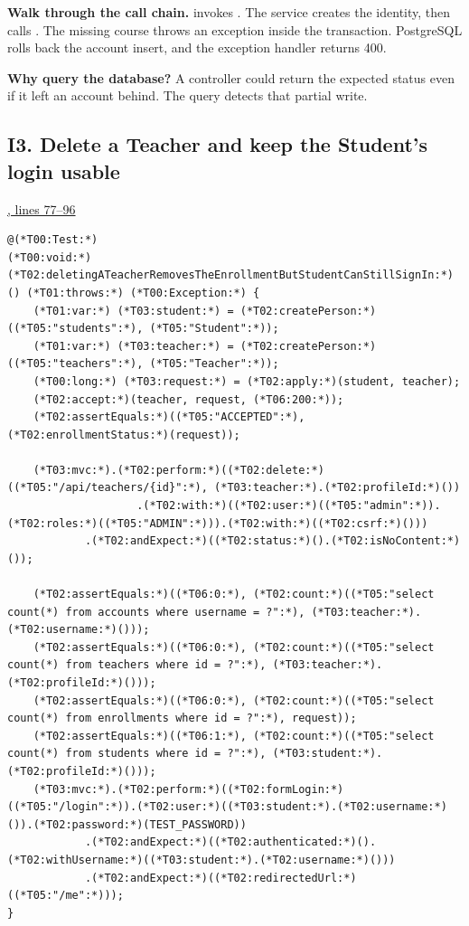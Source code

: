 \textbf{Walk through the call chain.}
 invokes .
The service creates the identity, then calls .
The missing course throws an exception inside the transaction. PostgreSQL
rolls back the account insert, and the exception handler returns 400.

\textbf{Why query the database?}
A controller could return the expected status even if it left an account
behind. The query detects that partial write.

\clearpage
\subsection{I3. Delete a Teacher and keep the Student's login usable}
\par\smallskip
{\small\href{\repo/blob/5d22aed7f6d4ef1e4c0b0c0dabf2962ba4b47608/src/test/java/com/example/fmschool/EnrollmentPersistenceIT.java#L77-L96}{, lines 77--96}}
\begin{lstlisting}[style=vsJava,firstnumber=77]
@(*T00:Test:*)
(*T00:void:*) (*T02:deletingATeacherRemovesTheEnrollmentButStudentCanStillSignIn:*)() (*T01:throws:*) (*T00:Exception:*) {
    (*T01:var:*) (*T03:student:*) = (*T02:createPerson:*)((*T05:"students":*), (*T05:"Student":*));
    (*T01:var:*) (*T03:teacher:*) = (*T02:createPerson:*)((*T05:"teachers":*), (*T05:"Teacher":*));
    (*T00:long:*) (*T03:request:*) = (*T02:apply:*)(student, teacher);
    (*T02:accept:*)(teacher, request, (*T06:200:*));
    (*T02:assertEquals:*)((*T05:"ACCEPTED":*), (*T02:enrollmentStatus:*)(request));

    (*T03:mvc:*).(*T02:perform:*)((*T02:delete:*)((*T05:"/api/teachers/{id}":*), (*T03:teacher:*).(*T02:profileId:*)())
                    .(*T02:with:*)((*T02:user:*)((*T05:"admin":*)).(*T02:roles:*)((*T05:"ADMIN":*))).(*T02:with:*)((*T02:csrf:*)()))
            .(*T02:andExpect:*)((*T02:status:*)().(*T02:isNoContent:*)());

    (*T02:assertEquals:*)((*T06:0:*), (*T02:count:*)((*T05:"select count(*) from accounts where username = ?":*), (*T03:teacher:*).(*T02:username:*)()));
    (*T02:assertEquals:*)((*T06:0:*), (*T02:count:*)((*T05:"select count(*) from teachers where id = ?":*), (*T03:teacher:*).(*T02:profileId:*)()));
    (*T02:assertEquals:*)((*T06:0:*), (*T02:count:*)((*T05:"select count(*) from enrollments where id = ?":*), request));
    (*T02:assertEquals:*)((*T06:1:*), (*T02:count:*)((*T05:"select count(*) from students where id = ?":*), (*T03:student:*).(*T02:profileId:*)()));
    (*T03:mvc:*).(*T02:perform:*)((*T02:formLogin:*)((*T05:"/login":*)).(*T02:user:*)((*T03:student:*).(*T02:username:*)()).(*T02:password:*)(TEST_PASSWORD))
            .(*T02:andExpect:*)((*T02:authenticated:*)().(*T02:withUsername:*)((*T03:student:*).(*T02:username:*)()))
            .(*T02:andExpect:*)((*T02:redirectedUrl:*)((*T05:"/me":*)));
}
\end{lstlisting}



